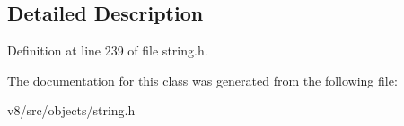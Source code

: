 \subsection{Detailed Description}


Definition at line 239 of file string.\+h.



The documentation for this class was generated from the following file\+:\begin{DoxyCompactItemize}
\item 
v8/src/objects/string.\+h\end{DoxyCompactItemize}
